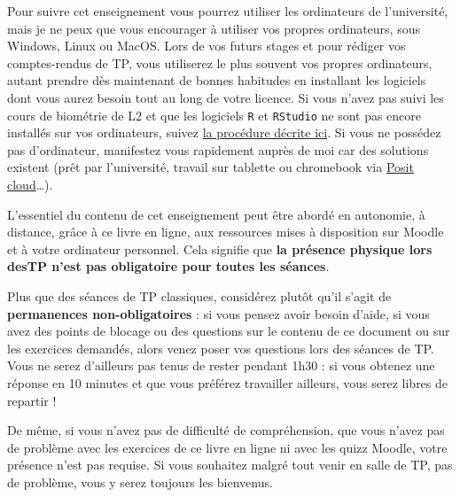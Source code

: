 \documentclass[
  french,
  a4paper,
  DIV=11,
  numbers=noendperiod,
  oneside]{scrreprt}
\begin{document}
Pour suivre cet enseignement vous pourrez utiliser les ordinateurs de
l'université, mais je ne peux que vous encourager à utiliser vos propres
ordinateurs, sous Windows, Linux ou MacOS. Lors de vos futurs stages et
pour rédiger vos comptes-rendus de TP, vous utiliserez le plus souvent
vos propres ordinateurs, autant prendre dès maintenant de bonnes
habitudes en installant les logiciels dont vous aurez besoin tout au
long de votre licence. Si vous n'avez pas suivi les cours de biométrie
de L2 et que les logiciels \texttt{R} et \texttt{RStudio} ne sont pas
encore installés sur vos ordinateurs, suivez
\href{https://besibo.github.io/BiometrieS3/01-R-basics.html\#sec-install}{la
procédure décrite ici}. Si vous ne possédez pas d'ordinateur, manifestez
vous rapidement auprès de moi car des solutions existent (prêt par
l'université, travail sur tablette ou chromebook via
\href{https://posit.cloud}{Posit cloud}\ldots).

\begin{tcolorbox}[enhanced jigsaw, arc=.35mm, bottomrule=.15mm, bottomtitle=1mm, breakable, colback=white, colbacktitle=quarto-callout-important-color!10!white, colframe=quarto-callout-important-color-frame, coltitle=black, left=2mm, leftrule=.75mm, opacityback=0, opacitybacktitle=0.6, rightrule=.15mm, title=\textcolor{quarto-callout-important-color}{\faExclamation}\hspace{0.5em}{Important}, titlerule=0mm, toprule=.15mm, toptitle=1mm]

L'essentiel du contenu de cet enseignement peut être abordé en
autonomie, à distance, grâce à ce livre en ligne, aux ressources mises à
disposition sur Moodle et à votre ordinateur personnel. Cela signifie
que \textbf{la présence physique lors desTP n'est pas obligatoire pour
toutes les séances}.

\end{tcolorbox}

Plus que des séances de TP classiques, considérez plutôt qu'il s'agit de
\textbf{permanences non-obligatoires} : si vous pensez avoir besoin
d'aide, si vous avez des points de blocage ou des questions sur le
contenu de ce document ou sur les exercices demandés, alors venez poser
vos questions lors des séances de TP. Vous ne serez d'ailleurs pas tenus
de rester pendant 1h30 : si vous obtenez une réponse en 10 minutes et
que vous préférez travailler ailleurs, vous serez libres de repartir !

De même, si vous n'avez pas de difficulté de compréhension, que vous
n'avez pas de problème avec les exercices de ce livre en ligne ni avec
les quizz Moodle, votre présence n'est pas requise. Si vous souhaitez
malgré tout venir en salle de TP, pas de problème, vous y serez toujours
les bienvenus.
\end{document}
